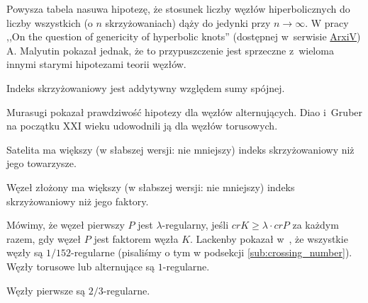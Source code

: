 Powysza tabela nasuwa hipotezę,
że stosunek liczby węzłów hiperbolicznych do liczby wszystkich
(o $n$ skrzyżowaniach) dąży do jedynki przy $n \to \infty$.
W pracy ,,On the question of genericity of hyperbolic knots'' (dostępnej w~serwisie \href{https://arxiv.org/abs/1612.03368v1}{ArxiV}) A. Malyutin pokazał jednak, że to przypuszczenie jest sprzeczne z~wieloma innymi starymi hipotezami teorii węzłów.

\begin{conjecture}
    Indeks skrzyżowaniowy jest addytywny względem sumy spójnej.
\end{conjecture}

Murasugi pokazał prawdziwość hipotezy dla węzłów alternujących.
Diao i~Gruber na początku XXI wieku udowodnili ją dla węzłów torusowych.

\begin{conjecture}
    Satelita ma większy
    (w słabszej wersji: nie mniejszy)
    indeks skrzyżowaniowy niż jego towarzysze.
\end{conjecture}

\begin{conjecture}
    Węzeł złożony ma większy
    (w słabszej wersji: nie mniejszy)
    indeks skrzyżowaniowy niż jego faktory.
\end{conjecture}

Mówimy, że węzeł pierwszy $P$ jest $\lambda$-regularny,
jeśli $cr K \ge \lambda \cdot cr P$ za każdym razem,
gdy węzeł $P$ jest faktorem węzła $K$.
Lackenby pokazał w~\cite{lackenby09}, że wszystkie węzły są $1/152$-regularne (pisaliśmy o tym w podsekcji \ref{sub:crossing_number}).
Węzły torusowe lub alternujące są $1$-regularne.

\begin{conjecture}
    Węzły pierwsze są $2/3$-regularne.
\end{conjecture}




